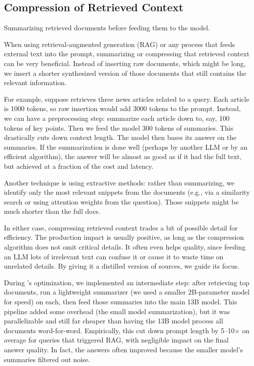 \subsection{Compression of Retrieved Context}
\label{sec:perf-rag-compression}
Summarizing retrieved documents before feeding them to the model.

When using retrieval-augmented generation (RAG) or any process that feeds external text into the prompt, summarizing or compressing that retrieved context can be very beneficial. Instead of inserting raw documents, which might be long, we insert a shorter synthesized version of those documents that still contains the relevant information.

For example, suppose \ishtar{} retrieves three news articles related to a query. Each article is 1000 tokens, so raw insertion would add 3000 tokens to the prompt. Instead, we can have a preprocessing step: summarize each article down to, say, 100 tokens of key points. Then we feed the model 300 tokens of summaries. This drastically cuts down context length. The model then bases its answer on the summaries. If the summarization is done well (perhaps by another LLM or by an efficient algorithm), the answer will be almost as good as if it had the full text, but achieved at a fraction of the cost and latency.

Another technique is using extractive methods: rather than summarizing, we identify only the most relevant snippets from the documents (e.g., via a similarity search or using attention weights from the question). Those snippets might be much shorter than the full docs.

In either case, compressing retrieved context trades a bit of possible detail for efficiency. The production impact is usually positive, as long as the compression algorithm does not omit critical details. It often even helps quality, since feeding an LLM lots of irrelevant text can confuse it or cause it to waste time on unrelated details. By giving it a distilled version of sources, we guide its focus.

During \ishtar{}’s optimization, we implemented an intermediate step: after retrieving top documents, run a lightweight summarizer (we used a smaller 2B-parameter model for speed) on each, then feed those summaries into the main 13B model. This pipeline added some overhead (the small model summarization), but it was parallelizable and still far cheaper than having the 13B model process all documents word-for-word. Empirically, this cut down prompt length by 5--10$\times$ on average for queries that triggered RAG, with negligible impact on the final answer quality. In fact, the answers often improved because the smaller model’s summaries filtered out noise.

